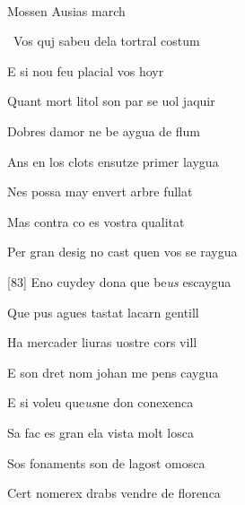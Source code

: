 \documentclass[12pt]{article}
\renewcommand{\espaiAbansEtiquetaPoema}{\vspace{0ex}}
\begin{document}
\begin{estrofa}

\espaiAbansEtiquetaPoema

\\

\begin{rubrica}

\textsection{} Mossen Ausias march \textsection{}

\end{rubrica}

\end{estrofa}


\begin{estrofa}

 \textparagraph\  Vos quj sabeu dela tortral costum

 E si nou feu placial vos hoyr

 Quant mort litol son par se uol jaquir

 Dobres damor ne be aygua de flum

 Ans en los clots ensutze primer laygua

 Nes possa may envert arbre fullat

 Mas contra co es vostra qualitat

 Per gran desig no cast quen vos se raygua

\end{estrofa}



\begin{estrofa}

 [83] Eno cuydey dona que be\textit{us} escaygua

 Que pus agues tastat lacarn gentill

 Ha mercader liuras uostre cors vill

 E son dret nom  johan me pens caygua

 E si voleu que\textit{us}ne don conexenca

 Sa fac es gran ela vista molt losca

 Sos fonaments son de lagost omosca

 Cert nomerex drabs vendre de florenca

\end{estrofa}
\end{document}
